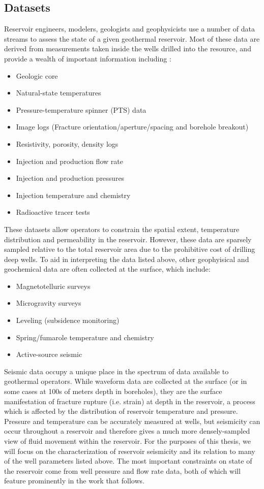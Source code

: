 \subsection{Datasets}
Reservoir engineers, modelers, geologists and geophysicists use a number of data streams to assess the state of a given geothermal reservoir. Most of these data are derived from measurements taken inside the wells drilled into the resource, and provide a wealth of important information including \citep{DiPippo_2016,Grant_2011}:
\begin{itemize}
  \item{Geologic core}
  \item{Natural-state temperatures}
  \item{Pressure-temperature spinner (PTS) data}
  \item{Image logs (Fracture orientation/aperture/spacing and borehole breakout)}
  \item{Resistivity, porosity, density logs}
  \item{Injection and production flow rate}
  \item{Injection and production pressures}
  \item{Injection temperature and chemistry}
  \item{Radioactive tracer tests}
\end{itemize}
These datasets allow operators to constrain the spatial extent, temperature distribution and permeability in the reservoir. However, these data are sparsely sampled relative to the total reservoir area due to the prohibitive cost of drilling deep wells. To aid in interpreting the data listed above, other geophyisical and geochemical data are often collected at the surface, which include:
\begin{itemize}
  \item{Magnetotelluric surveys}
  \item{Microgravity surveys}
  \item{Leveling (subsidence monitoring)}
  \item{Spring/fumarole temperature and chemistry}
  \item{Active-source seismic}
\end{itemize}

Seismic data occupy a unique place in the spectrum of data available to geothermal operators. While waveform data are collected at the surface (or in some cases at 100s of meters depth in boreholes), they are the surface manifestation of fracture rupture (i.e. strain) at depth in the reservoir, a process which is affected by the distribution of reservoir temperature and pressure. Pressure and temperature can be accurately measured at wells, but seismicity can occur throughout a reservoir and therefore gives a much more densely-sampled view of fluid movement within the reservoir. For the purposes of this thesis, we will focus on the characterization of reservoir seismicity and its relation to many of the well parameters listed above. The most important constraints on state of the reservoir come from well pressure and flow rate data, both of which will feature prominently in the work that follows. 

